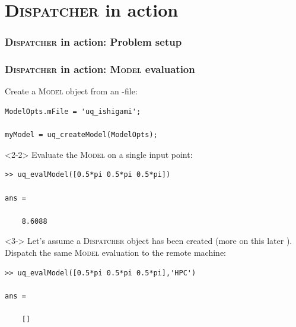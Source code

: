 \documentclass[]{rsuqbeamernew}
\begin{document}
\section{\textsc{Dispatcher} in action}

\begin{frame}[fragile]
\frametitle<1>{\textsc{Dispatcher} in action: Problem setup}
\frametitle<2->{\textsc{Dispatcher} in action: \textsc{Model} evaluation}

Create a \textsc{Model} object from an -file:
\begin{lstlisting}[basicstyle=\scriptsize]
ModelOpts.mFile = 'uq_ishigami';

myModel = uq_createModel(ModelOpts);
\end{lstlisting}

\begin{onlyenv}<2-2>
Evaluate the \textsc{Model} on a single input point:
\begin{lstlisting}[basicstyle=\scriptsize,numbers=none]
>> uq_evalModel([0.5*pi 0.5*pi 0.5*pi])

ans =
  
    8.6088
\end{lstlisting}
\end{onlyenv}

\begin{onlyenv}<3->
Let's assume a \textsc{Dispatcher} object has been created ({\altx more on this later }).
Dispatch the same \textsc{Model} evaluation to the remote machine:
\begin{lstlisting}[basicstyle=\scriptsize,numbers=none]
>> uq_evalModel([0.5*pi 0.5*pi 0.5*pi],'HPC')
  
ans =
    
    []
\end{lstlisting}
\end{onlyenv}

  
\end{frame}
\end{document}
